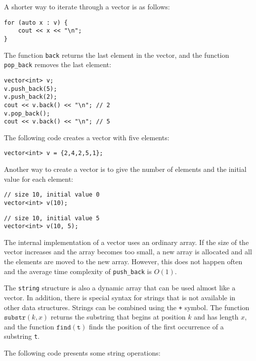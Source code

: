 \begin{samepage}
A shorter way to iterate through a vector is as follows:

\begin{lstlisting}
for (auto x : v) {
    cout << x << "\n";
}
\end{lstlisting}
\end{samepage}

The function \texttt{back} returns the last element
in the vector, and
the function \texttt{pop\_back} removes the last element:

\begin{lstlisting}
vector<int> v;
v.push_back(5);
v.push_back(2);
cout << v.back() << "\n"; // 2
v.pop_back();
cout << v.back() << "\n"; // 5
\end{lstlisting}

The following code creates a vector with five elements:

\begin{lstlisting}
vector<int> v = {2,4,2,5,1};
\end{lstlisting}

Another way to create a vector is to give the number
of elements and the initial value for each element:

\begin{lstlisting}
// size 10, initial value 0
vector<int> v(10);
\end{lstlisting}
\begin{lstlisting}
// size 10, initial value 5
vector<int> v(10, 5);
\end{lstlisting}

The internal implementation of a vector
uses an ordinary array.
If the size of the vector increases and
the array becomes too small,
a new array is allocated and all the
elements are moved to the new array.
However, this does not happen often and the
average time complexity of
\texttt{push\_back} is $O(1)$.


The \texttt{string} structure
is also a dynamic array that can be used almost like a vector.
In addition, there is special syntax for strings
that is not available in other data structures.
Strings can be combined using the \texttt{+} symbol.
The function $\texttt{substr}(k,x)$ returns the substring
that begins at position $k$ and has length $x$,
and the function $\texttt{find}(\texttt{t})$ finds the position
of the first occurrence of a substring \texttt{t}.

The following code presents some string operations:

